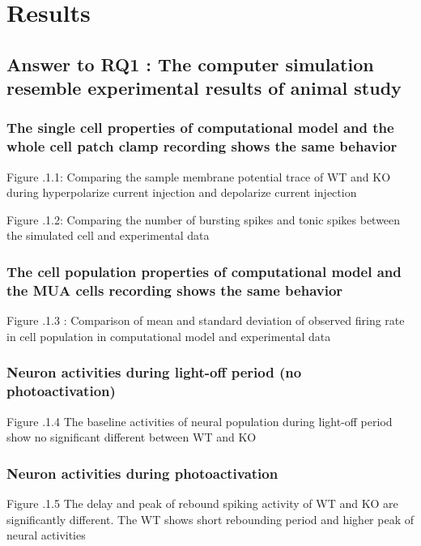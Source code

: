 \chapter{Results}

\section{ Answer to RQ1 : The computer simulation resemble experimental results of animal study}

\subsection{ The single cell properties of computational model and the whole cell patch clamp recording shows the same behavior}

Figure .1.1: Comparing the sample membrane potential trace of WT and KO during hyperpolarize current injection and depolarize current injection

Figure .1.2: Comparing the number of bursting spikes and tonic spikes between the simulated cell and experimental data


\subsection{  The cell population properties of computational model and the MUA cells recording shows the same behavior}

Figure .1.3 : Comparison of mean and standard deviation of observed firing rate in cell population in computational model and experimental data


\subsection{ Neuron activities during light-off period (no photoactivation)}

Figure .1.4 The baseline activities of neural population during light-off period show no significant different between WT and KO


\subsection{ Neuron activities during photoactivation}

Figure .1.5 The delay and peak of rebound spiking activity of WT and KO are significantly different. The WT shows short rebounding period and higher peak of neural activities


